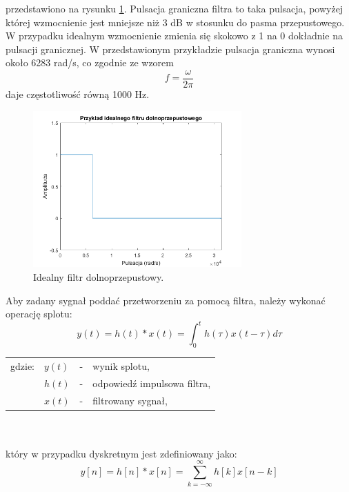 przedstawiono na rysunku \ref{rys:sub_lowpass}. Pulsacja graniczna filtra to taka pulsacja, powyżej której wzmocnienie jest mniejsze niż 3 dB w stosunku do pasma przepustowego. W przypadku idealnym wzmocnienie zmienia się skokowo z 1 na 0 dokładnie na pulsacji granicznej. W przedstawionym przykładzie pulsacja graniczna wynosi około 6283 rad/s, co zgodnie ze wzorem
\begin{equation} \label{equ:sub_frequency}
f = \frac{\omega}{2 \pi}
\end{equation}
daje częstotliwość równą 1000 Hz.
\begin{figure}[H]
	\centering
	\includegraphics[width=8cm]{grafiki/sub_lowpass}
	\captionsetup{justification=centering}
	\caption{Idealny filtr dolnoprzepustowy.}
	\label{rys:sub_lowpass}
\end{figure}

Aby zadany sygnał poddać przetworzeniu za pomocą filtra, należy wykonać operację splotu:
\begin{equation} \label{equ:sub_splot}
y(t)= h(t)*x(t) = \int_{0}^{t} h(\tau)x(t-\tau)d\tau
\end{equation}
\begin{tabular}{ l l l l}
	gdzie: & $y(t)$ &  - & wynik splotu, \\
	&	$h(t)$ & - &  odpowiedź impulsowa filtra,\\
	&	$x(t)$ & - &  filtrowany sygnał,\\
	
\end{tabular} \\ \\
który w przypadku dyskretnym jest zdefiniowany jako:
\begin{equation} \label{equ:sub_splot_dyskretny}
y[n]= h[n]*x[n] = \sum_{k=-\infty}^{\infty} h[k]x[n-k]
\end{equation}


